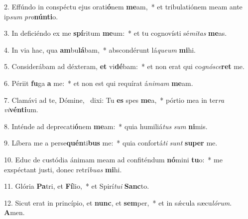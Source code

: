2. Effúndo in conspéctu ejus orati\textbf{ó}nem \textbf{me}am,~*  et tribulatiónem meam ante ip\textit{sum} \textit{pro}\textbf{nún}\textbf{ti}o.\

3. In deficiéndo ex me \textbf{spí}ritum \textbf{me}um:~*  et tu cognovísti sé\textit{mi}\textit{tas} \textbf{me}as.\

4. In via hac, qua \textbf{am}bu\textbf{lá}bam,~*  abscondérunt lá\textit{que}\textit{um} \textbf{mi}hi.\

5. Considerábam ad déxteram, \textbf{et} vi\textbf{dé}bam:~*  et non erat qui co\textit{gnó}\textit{sce}\textbf{ret} me.\

6. Périit \textbf{fu}ga \textbf{a} me:~*  et non est qui requírat á\textit{ni}\textit{mam} \textbf{me}am.\

7. Clamávi ad te, Dómine, \dag\  dixi: Tu \textbf{es} spes \textbf{me}a,~*  pórtio mea in ter\textit{ra} \textit{vi}\textbf{vén}\textbf{ti}um.\

8. Inténde ad deprecati\textbf{ó}nem \textbf{me}am:~*  quia humiliá\textit{tus} \textit{sum} \textbf{ni}mis.\

9. Líbera me a perse\textbf{quén}ti\textbf{bus} me:~*  quia confortá\textit{ti} \textit{sunt} \textbf{su}\textbf{per} me.\

10. Educ de custódia ánimam meam ad confiténdum \textbf{nó}mini \textbf{tu}o:~*  me exspéctant justi, donec retrí\textit{bu}\textit{as} \textbf{mi}hi.\

11. Glória \textbf{Pa}tri, et \textbf{Fí}lio,~*  et Spirí\textit{tu}\textit{i} \textbf{Sanc}to.\

12. Sicut erat in princípio, et \textbf{nunc}, et \textbf{sem}per,~*  et in sǽcula sæcu\textit{ló}\textit{rum}. \textbf{A}men.\

